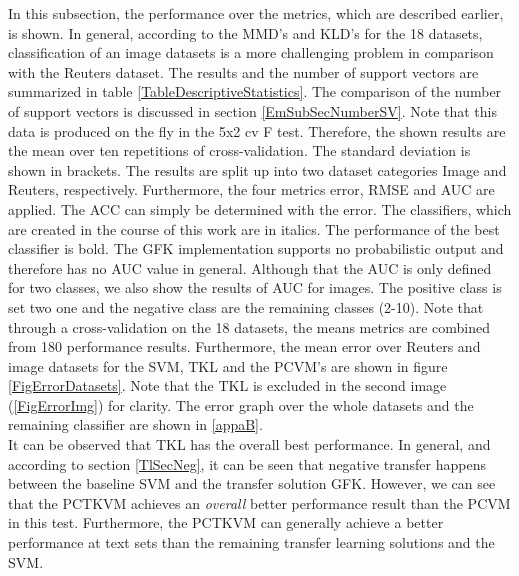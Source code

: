 In this subsection, the performance over the metrics, which are described earlier, is shown.
In general, according to the \acs{MMD}'s and \acs{KLD}'s for the 18 datasets, classification of an image datasets is a more challenging problem in comparison with the Reuters dataset.
The results and the number of support vectors are summarized in table \ref{TableDescriptiveStatistics}. 
The comparison of the number of support vectors is discussed in section \ref{EmSubSecNumberSV}.
Note that this data is produced on the fly in the 5x2 cv F test.
Therefore, the shown results are the mean over ten repetitions of cross-validation.
The standard deviation is shown in brackets. 
The results are split up into two dataset categories Image and Reuters, respectively.
Furthermore, the four metrics error, \acs{RMSE} and \acs{AUC} are applied.
The \ac{ACC} can simply be determined with the error.
The classifiers, which are created in the course of this work are in italics.
The performance of the best classifier is bold.
The \acs{GFK} implementation supports no probabilistic output and therefore has no \acs{AUC} value in general.
Although that the \acs{AUC} is only defined for two classes, we also show the results of \acs{AUC} for images. 
The positive class is set two one and the negative class are the remaining classes (2-10).
Note that through a cross-validation on the 18 datasets, the means metrics are combined from 180 performance results.
Furthermore, the mean error over Reuters and image datasets for the \acs{SVM}, \acs{TKL} and the \acs{PCVM}'s are shown in figure \ref{FigErrorDatasets}.
Note that the \acs{TKL} is excluded in the second image (\ref{FigErrorImg}) for clarity.
The error graph over the whole datasets and the remaining classifier are shown in \ref{appaB}.\\
It can be observed that \acs{TKL} has the overall best performance. 
In general, and according to section \ref{TlSecNeg}, it can be seen that negative transfer happens between the baseline \acs{SVM} and the transfer solution \acs{GFK}.
However, we can see that the \acs{PCTKVM}  achieves an \textit{overall} better performance result than the \acs{PCVM} in this test.
Furthermore, the \acs{PCTKVM} can generally achieve a better performance at text sets than the remaining transfer learning solutions and the \acs{SVM}.
\FloatBarrier
